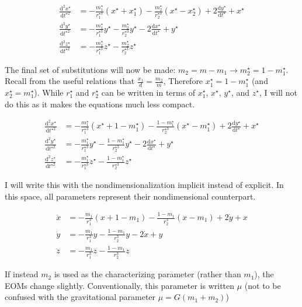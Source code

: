 \documentclass{article}
\newcommand{\dd}[2]{\frac{\mathrm{d}#1}{\mathrm{d}#2}}
\begin{document}
\[\begin{aligned}
    \dd{^2x^\star}{t^{\star2}}&=-\frac{m_1^\star}{r_1^{\star3}}(x^\star+x_1^\star)-\frac{m_2^\star}{r_2^{\star3}}(x^\star-x_2^\star)+2\dd{y^\star}{t^\star}+x^\star\\
    \dd{^2y^\star}{t^{\star2}}&=-\frac{m_1^\star}{r_1^{\star3}}y^\star-\frac{m_2^\star}{r_2^{\star3}}y^\star-2\dd{x^\star}{t^\star}+y^\star\\
    \dd{^2z^\star}{t^{\star2}}&=-\frac{m_1^\star}{r_1^{\star3}}z^\star-\frac{m_2^\star}{r_2^{\star3}}z^\star
\end{aligned}\]

The final set of substitutions will now be made: $m_2=m-m_1 \to m_2^\star=1-m_1^\star$. Recall from the useful relations that $\frac{x_1}{d}=\frac{m_2}{m}$, Therefore $x_1^\star=1-m_1^\star$ (and $x_2^\star=m_1^\star$). While $r_1^\star$ and $r_2^\star$ can be written in terms of $x_1^\star$, $x^\star$, $y^\star$, and $z^\star$, I will not do this as it makes the equations much less compact.

\[\begin{aligned}
    \dd{^2x^\star}{t^{\star2}}&=-\frac{m_1^\star}{r_1^{\star3}}(x^\star+1-m_1^\star)-\frac{1-m_1^\star}{r_2^{\star3}}(x^\star-m_1^\star)+2\dd{y^\star}{t^\star}+x^\star\\
    \dd{^2y^\star}{t^{\star2}}&=-\frac{m_1^\star}{r_1^{\star3}}y^\star-\frac{1-m_1^\star}{r_2^{\star3}}y^\star-2\dd{x^\star}{t^\star}+y^\star\\
    \dd{^2z^\star}{t^{\star2}}&=-\frac{m_1^\star}{r_1^{\star3}}z^\star-\frac{1-m_1^\star}{r_2^{\star3}}z^\star
\end{aligned}\]

I will write this with the nondimensionalization implicit instead of explicit. In this space, all parameters represent their nondimensional counterpart.

\[\begin{aligned}
    \ddot{x}&=-\frac{m_1}{r_1^3}(x+1-m_1)-\frac{1-m_1}{r_2^3}(x-m_1)+2\dot{y}+x\\
    \ddot{y}&=-\frac{m_1}{r_1^3}y-\frac{1-m_1}{r_2^3}y-2\dot{x}+y\\
    \ddot{z}&=-\frac{m_1}{r_1^3}z-\frac{1-m_1}{r_2^3}z
\end{aligned}\]

If instead $m_2$ is used as the characterizing parameter (rather than $m_1$), the EOMs change slightly. Conventionally, this parameter is written $\mu$ (not to be confused with the gravitational parameter $\mu=G(m_1+m_2)$)
\end{document}
